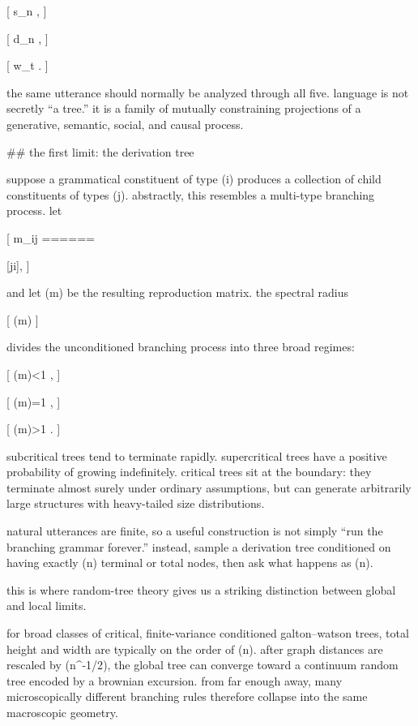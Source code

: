 [
s_n \quad {},
]

[
d_n \quad {},
]

[
w_t \quad {}.
]

the same utterance should normally be analyzed through all five. language is not secretly “a tree.” it is a family of mutually constraining projections of a generative, semantic, social, and causal process.

## the first limit: the derivation tree

suppose a grammatical constituent of type (i) produces a collection of child constituents of types (j). abstractly, this resembles a multi-type branching process. let

[
m_{ij}
======

[ji],
]

and let (m) be the resulting reproduction matrix. the spectral radius

[
\rho(m)
]

divides the unconditioned branching process into three broad regimes:

[
\rho(m)<1
\quad {},
]

[
\rho(m)=1
\quad {},
]

[
\rho(m)>1
\quad {}.
]

subcritical trees tend to terminate rapidly. supercritical trees have a positive probability of growing indefinitely. critical trees sit at the boundary: they terminate almost surely under ordinary assumptions, but can generate arbitrarily large structures with heavy-tailed size distributions.

natural utterances are finite, so a useful construction is not simply “run the branching grammar forever.” instead, sample a derivation tree conditioned on having exactly (n) terminal or total nodes, then ask what happens as (n\to\infty).

this is where random-tree theory gives us a striking distinction between global and local limits.

for broad classes of critical, finite-variance conditioned galton–watson trees, total height and width are typically on the order of (\sqrt n). after graph distances are rescaled by (n^{-1/2}), the global tree can converge toward a continuum random tree encoded by a brownian excursion. from far enough away, many microscopically different branching rules therefore collapse into the same macroscopic geometry.

